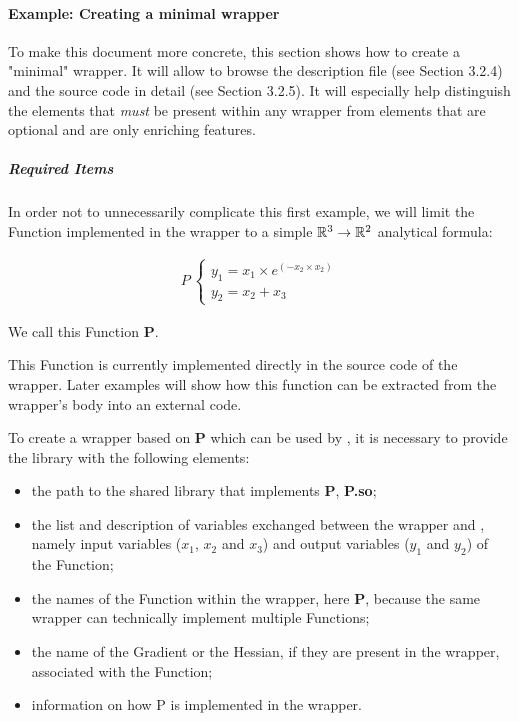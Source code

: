 \paragraph{Example: Creating a minimal wrapper}

To make this document more concrete, this section shows how to create a "minimal" wrapper. It will allow to browse the description file (see Section 3.2.4) and the source code in detail (see Section 3.2.5). It will especially help distinguish the elements that \emph{must} be present within any wrapper from elements that are optional and are only enriching features.

\subparagraph{Required Items}

In order not to unnecessarily complicate this first example, we will limit the Function implemented in the wrapper to a simple ${\mathbb R}^{3} \to {\mathbb R}^{2}$ analytical formula:

\begin{align*}
P\:\left\{\begin{array}{l}
y_1 = x_1 \times e^{(- x_2 \times x_2)} \\
y_2 = x_2 + x_3
\end{array}
\right.
\end{align*}

We call this Function {\bf P}.

This Function is currently implemented directly in the source code of the wrapper. Later examples will show how this function can be extracted from the wrapper's body into an external code.

To create a wrapper based on {\bf P} which can be used by \OT, it is necessary to provide the library with the following elements:
\begin{itemize}
\item the path to the shared library that implements {\bf P}, {\bf P.so};
\item the list and description of variables exchanged between the wrapper and \OT, namely input variables ($x_1$, $x_2$ and $x_3$) and output variables ($y_1$ and $y_2$) of the Function;
\item the names of the Function within the wrapper, here {\bf P}, because the same wrapper can technically implement multiple Functions;
\item the name of the Gradient or the Hessian, if they are present in the wrapper, associated with the Function;
\item information on how P is implemented in the wrapper.
\end{itemize}

